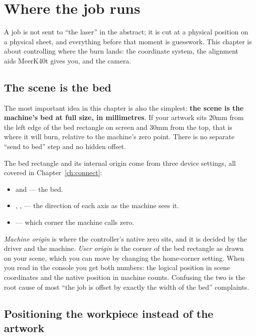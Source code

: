 \chapter{Where the job runs}
\label{ch:where}

A job is not sent to ``the laser'' in the abstract; it is cut at a physical
position on a physical sheet, and everything before that moment is guesswork.
This chapter is about controlling where the burn lands: the coordinate system,
the alignment aids MeerK40t gives you, and the camera.

\section{The scene is the bed}

The most important idea in this chapter is also the simplest: \textbf{the scene is
the machine's bed at full size, in millimetres}. If your artwork sits 20\unit{mm}
from the left edge of the bed rectangle on screen and 30\unit{mm} from the top,
that is where it will burn, relative to the machine's zero point. There is no
separate ``send to bed'' step and no hidden offset.

\noindent The bed rectangle and its internal origin come from three device
settings, all covered in Chapter~\ref{ch:connect}:

\begin{itemize}
  \item {} and  --- the bed.
  \item {}, ,  --- the direction of each
        axis as the machine sees it.
  \item {} --- which corner the machine calls zero.
\end{itemize}

\begin{notebox}
\emph{Machine origin} is where the controller's native zero sits, and it is
decided by the driver and the machine. \emph{User origin} is the corner of the bed
rectangle as drawn on your scene, which you can move by changing the home-corner
setting. When you read  in the console you get both numbers: the
logical position in scene coordinates and the native position in machine counts.
Confusing the two is the root cause of most ``the job is offset by exactly the
width of the bed'' complaints.
\end{notebox}

\section{Positioning the workpiece instead of the artwork}


